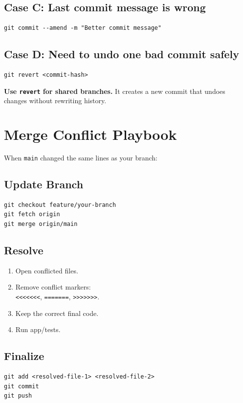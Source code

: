 \documentclass[11pt,a4paper]{article}
\begin{document}
\subsection{Case C: Last commit message is wrong}
\begin{Verbatim}[fontsize=\small]
git commit --amend -m "Better commit message"
\end{Verbatim}

\subsection{Case D: Need to undo one bad commit safely}
\begin{Verbatim}[fontsize=\small]
git revert <commit-hash>
\end{Verbatim}

\textbf{Use \texttt{revert} for shared branches.} It creates a new commit that undoes changes without rewriting history.

\section{Merge Conflict Playbook}
When \texttt{main} changed the same lines as your branch:

\subsection{Update Branch}
\begin{Verbatim}[fontsize=\small]
git checkout feature/your-branch
git fetch origin
git merge origin/main
\end{Verbatim}

\subsection{Resolve}
\begin{enumerate}[leftmargin=1.5em]
  \item Open conflicted files.
  \item Remove conflict markers:\\
  \texttt{<<<<<<<}, \texttt{=======}, \texttt{>>>>>>>}.
  \item Keep the correct final code.
  \item Run app/tests.
\end{enumerate}

\subsection{Finalize}
\begin{Verbatim}[fontsize=\small]
git add <resolved-file-1> <resolved-file-2>
git commit
git push
\end{Verbatim}
\end{document}
